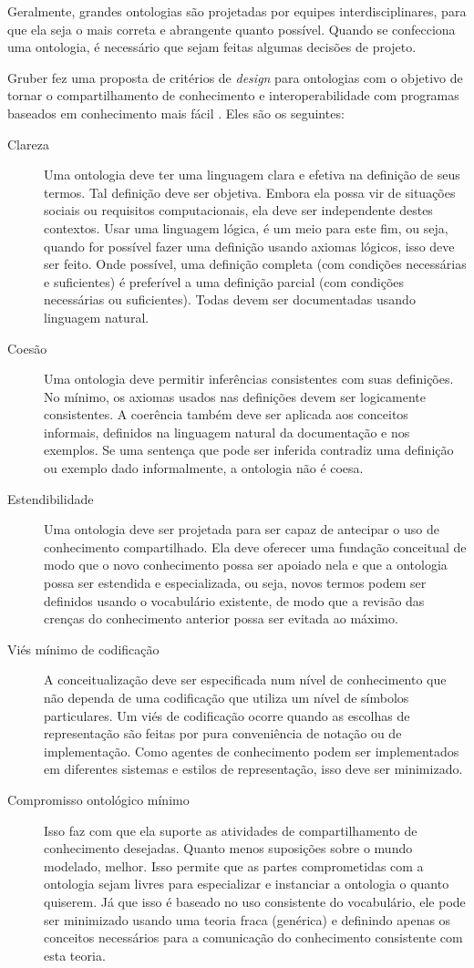 Geralmente, grandes ontologias são projetadas por equipes interdisciplinares, para que ela seja o mais correta e abrangente quanto possível. Quando se confecciona uma ontologia, é necessário que sejam feitas algumas decisões de projeto.  

Gruber fez uma proposta de critérios de \textit{design} para ontologias com o objetivo de tornar o compartilhamento de conhecimento e interoperabilidade com programas baseados em conhecimento mais fácil \citep{ontoGruber}. Eles são os seguintes:

\begin{description}
	\item[Clareza] Uma ontologia deve ter uma linguagem clara e efetiva na definição de seus termos. Tal definição deve ser objetiva. Embora ela possa vir de situações sociais ou requisitos computacionais, ela deve ser independente destes contextos. Usar uma linguagem lógica, é um meio para este fim, ou seja, quando for possível fazer uma definição usando axiomas lógicos, isso deve ser feito. Onde possível, uma definição completa (com condições necessárias e suficientes) é preferível a uma definição parcial (com condições necessárias ou suficientes). Todas devem ser documentadas usando linguagem natural.
	\item[Coesão] Uma ontologia deve permitir inferências consistentes com suas definições. No mínimo, os axiomas usados nas definições devem ser logicamente consistentes. A coerência também deve ser aplicada aos conceitos informais, definidos na linguagem natural da documentação e nos exemplos. Se uma sentença que pode ser inferida contradiz uma definição ou exemplo dado informalmente, a ontologia não é coesa.
	\item[Estendibilidade] Uma ontologia deve ser projetada para ser capaz de antecipar o uso de conhecimento compartilhado. Ela deve oferecer uma fundação conceitual de modo que o novo conhecimento possa ser apoiado nela e que a ontologia possa ser estendida e especializada, ou seja, novos termos podem ser definidos usando o vocabulário existente, de modo que a revisão das crenças do conhecimento anterior possa ser evitada ao máximo.
	\item[Viés mínimo de codificação] A conceitualização deve ser especificada num nível de conhecimento que não dependa de uma codificação que utiliza um nível de símbolos particulares. Um viés de codificação ocorre quando as escolhas de representação são feitas por pura conveniência de notação ou de implementação. Como agentes de conhecimento podem ser implementados em diferentes sistemas e estilos de representação, isso deve ser minimizado.
	\item[Compromisso ontológico mínimo] Isso faz com que ela suporte as atividades de compartilhamento de conhecimento desejadas. Quanto menos suposições sobre o mundo modelado, melhor. Isso permite que as partes comprometidas com a ontologia sejam livres para especializar e instanciar a ontologia o quanto quiserem. Já que isso é baseado no uso consistente do vocabulário, ele pode ser minimizado usando uma teoria fraca (genérica) e definindo apenas os conceitos necessários para a comunicação do conhecimento consistente com esta teoria.
\end{description}

